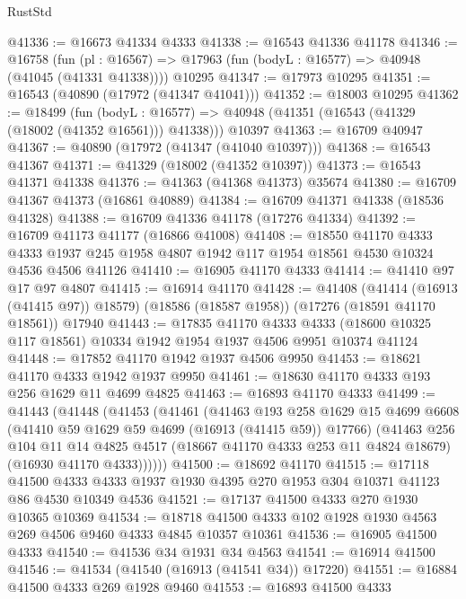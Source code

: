 \begin{lexlean}{RustStd}
\begin{coremodule}
@41336 := @16673 @41334 @4333
@41338 := @16543 @41336 @41178
@41346 := @16758
    (fun (pl : @16567) => @17963 (fun (bodyL : @16577) => @40948 (@41045 (@41331 @41338))))
    @10295
@41347 := @17973 @10295
@41351 := @16543 (@40890 (@17972 (@41347 @41041)))
@41352 := @18003 @10295
@41362 := @18499
    (fun (bodyL : @16577) => @40948 (@41351 (@16543 (@41329 (@18002 (@41352 @16561))) @41338)))
    @10397
@41363 := @16709 @40947
@41367 := @40890 (@17972 (@41347 (@41040 @10397)))
@41368 := @16543 @41367
@41371 := @41329 (@18002 (@41352 @10397))
@41373 := @16543 @41371 @41338
@41376 := @41363 (@41368 @41373) @35674
@41380 := @16709 @41367 @41373 (@16861 @40889)
@41384 := @16709 @41371 @41338 (@18536 @41328)
@41388 := @16709 @41336 @41178 (@17276 @41334)
@41392 := @16709 @41173 @41177 (@16866 @41008)
@41408 := @18550
    @41170
    @4333
    @4333
    @1937
    @245
    @1958
    @4807
    @1942
    @117
    @1954
    @18561
    @4530
    @10324
    @4536
    @4506
    @41126
@41410 := @16905 @41170 @4333
@41414 := @41410 @97 @17 @97 @4807
@41415 := @16914 @41170
@41428 := @41408
    (@41414 (@16913 (@41415 @97)) @18579)
    (@18586 (@18587 @1958))
    (@17276 (@18591 @41170 @18561))
    @17940
@41443 := @17835
    @41170
    @4333
    @4333
    (@18600 @10325 @117 @18561)
    @10334
    @1942
    @1954
    @1937
    @4506
    @9951
    @10374
    @41124
@41448 := @17852 @41170 @1942 @1937 @4506 @9950
@41453 := @18621 @41170 @4333 @1942 @1937 @9950
@41461 := @18630 @41170 @4333 @193 @256 @1629 @11 @4699 @4825
@41463 := @16893 @41170 @4333
@41499 := @41443
    (@41448
      (@41453
        (@41461
          (@41463
            @193
            @258
            @1629
            @15
            @4699
            @6608
            (@41410 @59 @1629 @59 @4699 (@16913 (@41415 @59)) @17766)
            (@41463
              @256
              @104
              @11
              @14
              @4825
              @4517
              (@18667 @41170 @4333 @253 @11 @4824 @18679)
              (@16930 @41170 @4333))))))
@41500 := @18692 @41170
@41515 := @17118
    @41500
    @4333
    @4333
    @1937
    @1930
    @4395
    @270
    @1953
    @304
    @10371
    @41123
    @86
    @4530
    @10349
    @4536
@41521 := @17137 @41500 @4333 @270 @1930 @10365 @10369
@41534 := @18718 @41500 @4333 @102 @1928 @1930 @4563 @269 @4506 @9460 @4333 @4845 @10357 @10361
@41536 := @16905 @41500 @4333
@41540 := @41536 @34 @1931 @34 @4563
@41541 := @16914 @41500
@41546 := @41534 (@41540 (@16913 (@41541 @34)) @17220)
@41551 := @16884 @41500 @4333 @269 @1928 @9460
@41553 := @16893 @41500 @4333

\end{coremodule}
\end{lexlean}

